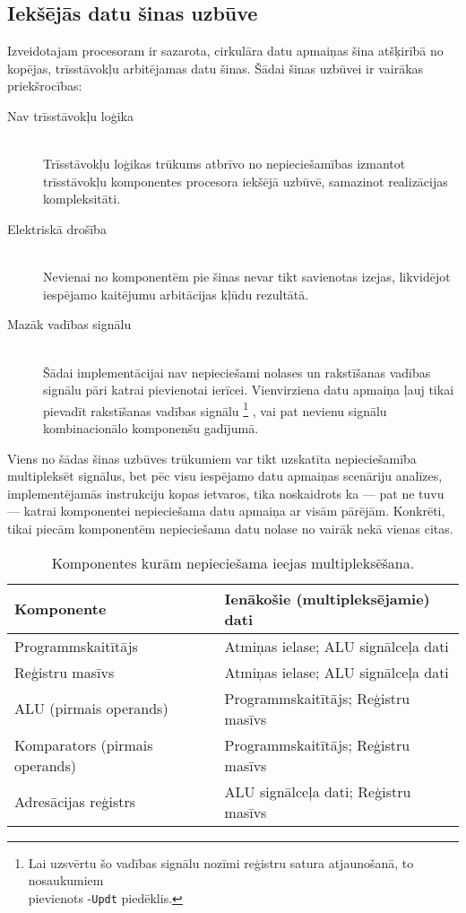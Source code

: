 \subsection{Iekšējās datu šinas uzbūve} \label{sec:databus}
Izveidotajam procesoram ir sazarota, cirkulāra datu apmaiņas šina atšķirībā no kopējas,
trīsstāvokļu arbitējamas datu šinas. Šādai šinas uzbūvei ir vairākas
priekšrocības:
\begin{description}
	\item[Nav trīsstāvokļu loģika] \hfill \\
		Trīsstāvokļu loģikas trūkums atbrīvo no nepieciešamības izmantot
		trīsstāvokļu komponentes procesora iekšējā uzbūvē,
		samazinot realizācijas kompleksitāti.
	\item[Elektriskā drošība] \hfill \\ %
		Nevienai no komponentēm pie šinas nevar tikt savienotas izejas,
		likvidējot iespējamo kaitējumu arbitācijas kļūdu rezultātā.
	\item[Mazāk vadības signālu] \hfill \\
		Šādai implementācijai nav nepieciešami nolases un rakstīšanas
		vadības signālu pāri katrai pievienotai ierīcei. Vienvirziena datu
		apmaiņa ļauj tikai pievadīt rakstīšanas vadības signālu%
		\footnote{Lai uzsvērtu šo vadības signālu nozīmi reģistru satura
			atjaunošanā, to nosaukumiem\\ pievienots -\texttt{Updt} piedēklis.}%
		, vai pat nevienu signālu kombinacionālo komponenšu gadījumā.
\end{description}

Viens no šādas šinas uzbūves trūkumiem var tikt uzskatīta nepieciešamība
multipleksēt signālus, bet pēc visu iespējamo datu apmaiņas scenāriju analīzes,
implementējamās instrukciju kopas ietvaros, tika noskaidrots ka --- 
pat ne tuvu --- katrai komponentei nepieciešama datu apmaiņa ar visām pārējām.
Konkrēti, tikai piecām komponentēm nepieciešama datu nolase no vairāk
nekā vienas citas.

\begin{table}[hb]
	\centering
	\caption{Komponentes kurām nepieciešama ieejas multipleksēšana.}
	\label{tbl:muxes}
	\begin{tabular}{ll}
		\toprule
		Komponente & Ienākošie (multipleksējamie) dati\\ 
		\midrule
		Programmskaitītājs & Atmiņas ielase; ALU signālceļa dati\\
		Reģistru masīvs & Atmiņas ielase; ALU signālceļa dati\\
		ALU (pirmais operands) & Programmskaitītājs; Reģistru masīvs\\
		Komparators (pirmais operands) & Programmskaitītājs; Reģistru masīvs\\
		Adresācijas reģistrs & ALU signālceļa dati; Reģistru masīvs\\
		\bottomrule
	\end{tabular}
\end{table}

